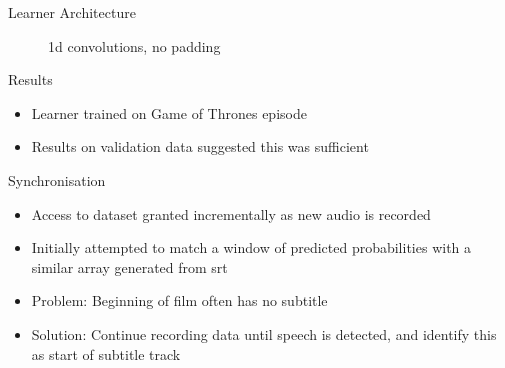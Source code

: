 \documentclass[notes]{beamer}
\begin{document}
\begin{frame}{Learner Architecture}
\begin{minipage}{0.45\textwidth}
\begin{figure}
		\caption{1d convolutions, no padding}
	\end{figure}
	
\end{minipage}
\end{frame}


\begin{frame}{Results}
\begin{itemize}
	\item Learner trained on Game of Thrones episode
	\item Results on validation data suggested this was sufficient
\end{itemize}
\end{frame}


\begin{frame}{Synchronisation}
\begin{itemize}
	\item Access to dataset granted incrementally as new audio is recorded
	\item Initially attempted to match a window of predicted probabilities with a similar array generated from srt
	\item Problem: Beginning of film often has no subtitle
	\item Solution: Continue recording data until speech is detected, and identify this as start of subtitle track
\end{itemize}
\end{frame}
\end{document}
